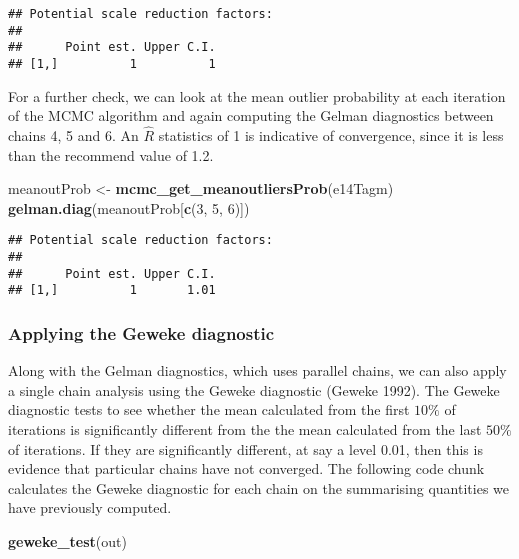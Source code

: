 \documentclass[]{article}
\newenvironment{Shaded}{\begin{snugshade}}{\end{snugshade}}
\newcommand{\KeywordTok}[1]{\textcolor[rgb]{0.13,0.29,0.53}{\textbf{{#1}}}}
\newcommand{\DecValTok}[1]{\textcolor[rgb]{0.00,0.00,0.81}{{#1}}}
\newcommand{\StringTok}[1]{\textcolor[rgb]{0.31,0.60,0.02}{{#1}}}
\newcommand{\NormalTok}[1]{{#1}}
\begin{document}
\begin{verbatim}
## Potential scale reduction factors:
## 
##      Point est. Upper C.I.
## [1,]          1          1
\end{verbatim}

For a further check, we can look at the mean outlier probability at each
iteration of the MCMC algorithm and again computing the Gelman
diagnostics between chains 4, 5 and 6. An \(\hat{R}\) statistics of 1 is
indicative of convergence, since it is less than the recommend value of
1.2.

\begin{Shaded}
\begin{Highlighting}[]
\NormalTok{meanoutProb <-}\StringTok{ }\KeywordTok{mcmc_get_meanoutliersProb}\NormalTok{(e14Tagm)}
\KeywordTok{gelman.diag}\NormalTok{(meanoutProb[}\KeywordTok{c}\NormalTok{(}\DecValTok{3}\NormalTok{, }\DecValTok{5}\NormalTok{, }\DecValTok{6}\NormalTok{)])}
\end{Highlighting}
\end{Shaded}

\begin{verbatim}
## Potential scale reduction factors:
## 
##      Point est. Upper C.I.
## [1,]          1       1.01
\end{verbatim}

\subsubsection{Applying the Geweke
diagnostic}\label{applying-the-geweke-diagnostic}

Along with the Gelman diagnostics, which uses parallel chains, we can
also apply a single chain analysis using the Geweke diagnostic (Geweke
1992). The Geweke diagnostic tests to see whether the mean calculated
from the first \(10\%\) of iterations is significantly different from
the the mean calculated from the last \(50\%\) of iterations. If they
are significantly different, at say a level 0.01, then this is evidence
that particular chains have not converged. The following code chunk
calculates the Geweke diagnostic for each chain on the summarising
quantities we have previously computed.

\begin{Shaded}
\begin{Highlighting}[]
\KeywordTok{geweke_test}\NormalTok{(out)}
\end{Highlighting}
\end{Shaded}
\end{document}
